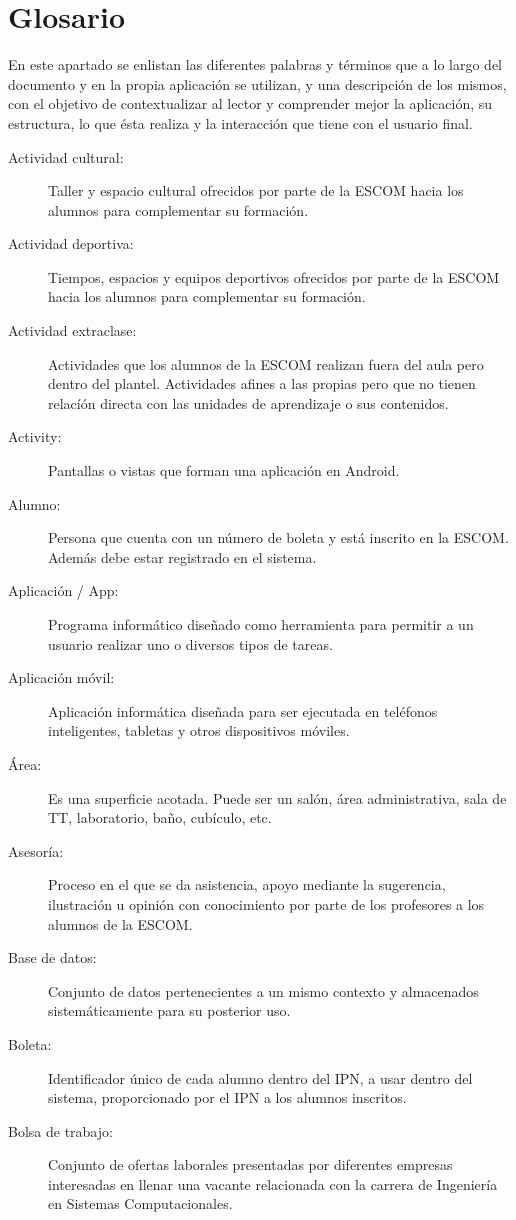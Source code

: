 \section{Glosario}

\noindent
En este apartado se enlistan las diferentes palabras y términos que a lo largo del documento y en la propia aplicación se utilizan, y una descripción de los mismos, con el objetivo de contextualizar al lector y comprender mejor la aplicación, su estructura, lo que ésta realiza y la interacción que tiene con el usuario final. \\

\begin{description}
	\item[Actividad cultural:] Taller y espacio cultural ofrecidos por parte de la ESCOM hacia los alumnos para complementar su formación. 
	\item[Actividad deportiva:] Tiempos, espacios y equipos deportivos ofrecidos por parte de la ESCOM hacia los alumnos para complementar su formación. 
	\item[Actividad extraclase:] Actividades que los alumnos de la ESCOM realizan fuera del aula pero dentro del plantel. Actividades afines a las propias pero que no tienen relacíón directa con las unidades de aprendizaje o sus contenidos. 
	\item[Activity:] Pantallas o vistas que forman una aplicación en Android.
	\item[Alumno:] Persona que cuenta con un número de boleta y está inscrito en la ESCOM. Además debe estar registrado en el sistema.
	\item[Aplicación / App:] Programa informático diseñado como herramienta para permitir a un usuario realizar uno o diversos tipos de tareas. 
	\item[Aplicación móvil:] Aplicación informática diseñada para ser ejecutada en teléfonos inteligentes, tabletas y otros dispositivos móviles. 
	\item[Área:] Es una superficie acotada. Puede ser un salón, área administrativa, sala de TT, laboratorio, baño, cubículo, etc.
	\item[Asesoría:] Proceso en el que se da asistencia, apoyo mediante la sugerencia, ilustración u opinión con conocimiento por parte de los profesores a los alumnos de la ESCOM.
	
	\item[Base de datos:] Conjunto de datos pertenecientes a un mismo contexto y almacenados sistemáticamente para su posterior uso.
	\item[Boleta:] Identificador único de cada alumno dentro del IPN, a usar dentro del sistema, proporcionado por el IPN a los alumnos inscritos.
	\item[Bolsa de trabajo:] Conjunto de ofertas laborales presentadas por diferentes empresas interesadas en llenar una vacante relacionada con la carrera de Ingeniería en Sistemas Computacionales.
	

\end{description}

